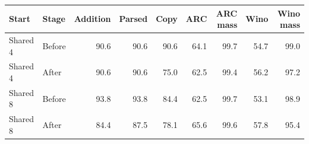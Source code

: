 \begin{tabular}{llrrrrrrr}
\toprule
Start & Stage & Addition & Parsed & Copy & ARC & ARC mass & Wino & Wino mass \\
\midrule
Shared 4 & Before & 90.6 & 90.6 & 90.6 & 64.1 & 99.7 & 54.7 & 99.0 \\
Shared 4 & After & 90.6 & 90.6 & 75.0 & 62.5 & 99.4 & 56.2 & 97.2 \\
Shared 8 & Before & 93.8 & 93.8 & 84.4 & 62.5 & 99.7 & 53.1 & 98.9 \\
Shared 8 & After & 84.4 & 87.5 & 78.1 & 65.6 & 99.6 & 57.8 & 95.4 \\
\bottomrule
\end{tabular}
